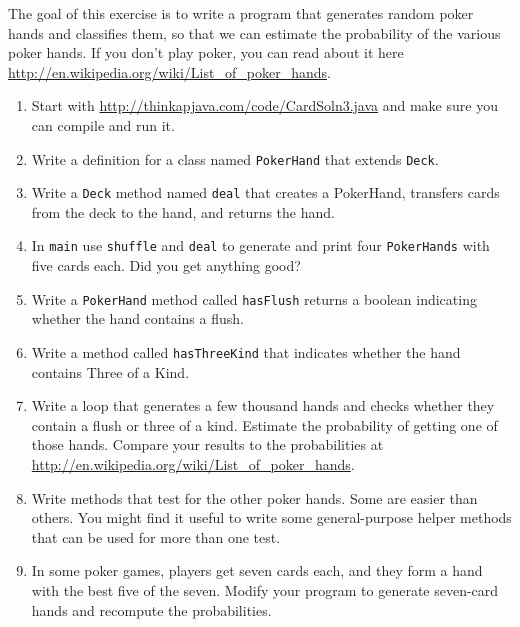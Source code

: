 \begin{exercise}
The goal of this exercise is to write a program that generates random
poker hands and classifies them, so that we can estimate the
probability of the various poker hands.  If you don't play poker, you
can read about it here
\url{http://en.wikipedia.org/wiki/List_of_poker_hands}.

\begin{enumerate}

\item Start with \url{http://thinkapjava.com/code/CardSoln3.java}
and make sure you can compile and run it.

\item Write a definition for a class named {\tt PokerHand}
that extends {\tt Deck}.

\item Write a {\tt Deck} method named {\tt deal} that creates
a PokerHand, transfers cards from the deck to the hand, and returns
the hand.

\item In {\tt main} use {\tt shuffle} and
{\tt deal} to generate and print four {\tt PokerHands} with
five cards each.  Did you get anything good?

\item Write a {\tt PokerHand} method called {\tt hasFlush}
returns a boolean indicating whether the
hand contains a flush.

\item Write a method called {\tt hasThreeKind} that
indicates whether the hand contains
Three of a Kind.

\item Write a loop that generates a few thousand hands and
checks whether they contain a flush or three of a kind.
Estimate the probability of getting one of those hands.
Compare your results to the probabilities at
\url{http://en.wikipedia.org/wiki/List_of_poker_hands}.

\item Write methods that test for the other poker hands.  Some
are easier than others.  You might find it useful to write some
general-purpose helper methods that can be used for more than one
test.

\item In some poker games, players get seven cards each, and
they form a hand with the best five of the seven.  Modify your
program to generate seven-card hands and recompute the probabilities.

\end{enumerate}
\end{exercise}


